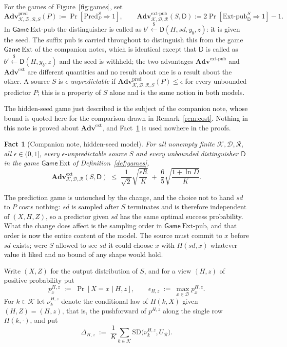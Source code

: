 \documentclass{aicr-solution}
\newcommand{\Adv}{\mathbf{Adv}}
\newcommand{\Gm}{\mathsf{Game}}
\newcommand{\Pred}{\mathrm{Pred}}
\newcommand{\Ext}{\mathrm{Ext}}
\newcommand{\Extp}{\mathrm{Ext}\text{-}\mathrm{pub}}
\newcommand{\pred}{\mathrm{pred}}
\newcommand{\ext}{\mathrm{ext}}
\newcommand{\extp}{\mathrm{ext}\text{-}\mathrm{pub}}
\newcommand{\sd}{\mathit{sd}}
\renewcommand{\sample}{\stackrel{{\scriptscriptstyle\$}}{\leftarrow}}
\newcommand{\SD}{\mathrm{SD}}
\newcommand{\calK}{\mathcal{K}}
\newcommand{\calD}{\mathcal{D}}
\newcommand{\calR}{\mathcal{R}}
\newtheorem{fact}{Fact}
\begin{document}
\begin{definition}\label{def:games}
For the games of Figure~\ref{fig:games}, set
\[
  \Adv^{\pred}_{\calK,\calD,\calR,S}(P) := \Pr[\Pred^{S}_{P} \Rightarrow 1] ,
  \qquad
  \Adv^{\extp}_{\calK,\calD,\calR}(S,\mathsf{D}) := 2\Pr[\Extp^{S}_{\mathsf{D}} \Rightarrow 1] - 1 .
\]
In $\Gm\ \Extp$ the distinguisher is called as $b' \sample \mathsf{D}(H, \sd, y_b, z)$: it is
given the seed. The suffix
$\mathrm{pub}$ is carried throughout to distinguish this from the game $\Gm\ \Ext$ of the
companion notes, which is identical except that $\mathsf{D}$ is called as
$b' \sample \mathsf{D}(H, y_b, z)$ and the seed is withheld; the two advantages
$\Adv^{\extp}$ and $\Adv^{\ext}$ are different quantities and no result about one is a result
about the other. A source $S$ is \emph{$\epsilon$-unpredictable} if
$\Adv^{\pred}_{\calK,\calD,\calR,S}(P) \le \epsilon$ for every unbounded predictor $P$; this is a
property of $S$ alone and is the same notion in both models.
\end{definition}

The hidden-seed game just described is the subject of the companion note, whose bound is quoted
here for the comparison drawn in Remark~\ref{rem:cost}. Nothing in this note is proved about
$\Adv^{\ext}$, and Fact~\ref{fact:hidden} is used nowhere in the proofs.

\begin{fact}[Companion note, hidden-seed model]\label{fact:hidden}
For all nonempty finite $\calK, \calD, \calR$, all $\epsilon \in (0,1]$, every
$\epsilon$-unpredictable source $S$ and every unbounded distinguisher $\mathsf{D}$ in the game
$\Gm\ \Ext$ of Definition~\ref{def:games},
\[
  \Adv^{\ext}_{\calK,\calD,\calR}(S,\mathsf{D})
  \;\le\; \frac{1}{\sqrt{2}}\sqrt{\frac{\epsilon R}{K}}
       \;+\; \frac{6}{5}\sqrt{\frac{1 + \ln D}{K}} .
\]
\end{fact}

The prediction game is untouched by the change, and the choice not to hand $\sd$ to $P$ costs
nothing: $\sd$ is sampled after $S$ terminates and is therefore independent of $(X,H,Z)$, so a
predictor given $\sd$ has the same optimal success probability. What the change does affect is
the sampling order in $\Gm\ \Extp$, and that order is now the entire content of the model. The
source must commit to $x$ before $\sd$ exists; were $S$ allowed to see $\sd$ it could choose $x$
with $H(\sd,x)$ whatever value it liked and no bound of any shape would hold.

Write $(X,Z)$ for the output distribution of $S$, and for a view $(H,z)$ of positive probability put
\[
  p^{H,z}_{x} \;:=\; \Pr[X = x \mid H, z] ,
  \qquad
  \epsilon_{H,z} \;:=\; \max_{x \in \calD} p^{H,z}_{x} .
\]
For $k \in \calK$ let $\nu^{H,z}_{k}$ denote the conditional law of $H(k, X)$ given $(H,Z) = (H,z)$,
that is, the pushforward of $p^{H,z}$ along the single row $H(k,\cdot)$, and put
\[
  \Delta_{H,z} \;:=\; \frac{1}{K}\sum_{k \in \calK} \SD\bigl(\nu^{H,z}_{k}, U_{\calR}\bigr).
\]
\end{document}
